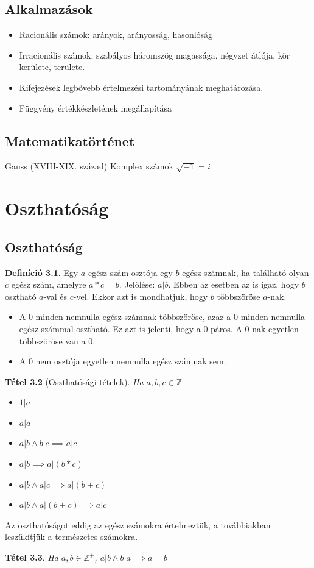 \documentclass[twoside,12pt]{report}
\newtheorem{theorem}{Tétel}[section]
\theoremstyle{definition}
\newtheorem{definition}[theorem]{Definíció}
\begin{document}
\section{Alkalmazások}
	\begin{itemize}
		\item Racionális számok: arányok, arányosság, hasonlóság
		\item Irracionális számok: szabályos háromszög magassága, négyzet átlója, kör kerülete, területe.
		\item Kifejezések legbővebb értelmezési tartományának meghatározása.
		\item Függvény értékkészletének megállapítása
	\end{itemize}
\section{Matematikatörténet}
	\begin{outline}
		\1 Gauss (XVIII-XIX. század)
			\2 Komplex számok
			\2 $\sqrt{-1}=i$
	\end{outline}
\chapter{Oszthatóság}
\section{Oszthatóság}
	\begin{definition}
		Egy $a$ egész szám osztója egy $b$ egész számnak, ha található olyan $c$ egész szám,
		amelyre $a*c=b$. Jelölése: $a\vert b$. Ebben az esetben az is igaz, hogy $b$ osztható $a$-val és $c$-vel. Ekkor azt is mondhatjuk, hogy $b$ többszöröse $a$-nak.
	\end{definition}
	\begin{itemize}
		\item A 0 minden nemnulla egész számnak többszöröse, azaz a 0 minden nemnulla egész számmal osztható. Ez azt is jelenti, hogy a 0 páros. A 0-nak egyetlen többszöröse van a 0.
		\item A 0 nem osztója egyetlen nemnulla egész számnak sem.
	\end{itemize}
	\begin{theorem}[Oszthatósági tételek]
		Ha $a,b,c\in\mathbb{Z}$
		\begin{itemize}
			\item $1\vert a$
			\item $a\vert a$
			\item $a\vert b\wedge b\vert c\implies a\vert c$
			\item $a\vert b\implies a\vert(b*c)$
			\item $a\vert b\wedge a\vert c\implies a\vert (b\pm c)$
			\item $a\vert b\wedge a\vert (b+c)\implies a\vert c$
		\end{itemize}
	\end{theorem}
	Az oszthatóságot eddig az egész számokra értelmeztük, a továbbiakban leszűkítjük a természetes számokra.
	\begin{theorem}
		Ha $a, b\in \mathbb{Z}^+$, $a\vert b\wedge b\vert a\implies a=b$
	\end{theorem}
	\noindent
\end{document}
